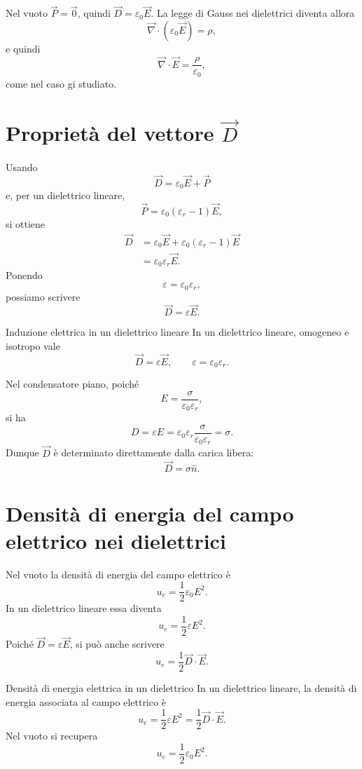 \documentclass[a4paper]{article}
\begin{document}
Nel vuoto \(\vec{P}=\vec{0}\), quindi \(\vec{D}=\varepsilon_0\vec{E}\). La legge di Gauss nei dielettrici diventa allora
\[
    \vec{\nabla}\cdot(\varepsilon_0\vec{E})=\rho,
\]
e quindi
\[
    \vec{\nabla}\cdot\vec{E}=\frac{\rho}{\varepsilon_0},
\]
come nel caso gi studiato.

\section{Proprietà del vettore \(\vec{D}\)}

Usando
\[
    \vec{D}=\varepsilon_0\vec{E}+\vec{P}
\]
e, per un dielettrico lineare,
\[
    \vec{P}=\varepsilon_0(\varepsilon_r-1)\vec{E},
\]
si ottiene
\begin{align*}
    \vec{D}
    &=\varepsilon_0\vec{E}+\varepsilon_0(\varepsilon_r-1)\vec{E} \\
    &=\varepsilon_0\varepsilon_r\vec{E}.
\end{align*}
Ponendo
\[
    \varepsilon=\varepsilon_0\varepsilon_r,
\]
possiamo scrivere
\[
    \vec{D}=\varepsilon\vec{E}.
\]

\begin{snippetproposition}{Induzione elettrica in un dielettrico lineare}
    In un dielettrico lineare, omogeneo e isotropo vale
    \[
        \vec{D}=\varepsilon\vec{E},
        \qquad
        \varepsilon=\varepsilon_0\varepsilon_r.
    \]
\end{snippetproposition}

Nel condensatore piano, poiché
\[
    E=\frac{\sigma}{\varepsilon_0\varepsilon_r},
\]
si ha
\[
    D=\varepsilon E=\varepsilon_0\varepsilon_r\frac{\sigma}{\varepsilon_0\varepsilon_r}=\sigma.
\]
Dunque \(\vec{D}\) è determinato direttamente dalla carica libera:
\[
    \vec{D}=\sigma\hat{n}.
\]

\section{Densità di energia del campo elettrico nei dielettrici}

Nel vuoto la densità di energia del campo elettrico è
\[
    u_e=\frac{1}{2}\varepsilon_0E^2.
\]
In un dielettrico lineare essa diventa
\[
    u_e=\frac{1}{2}\varepsilon E^2.
\]
Poiché \(\vec{D}=\varepsilon\vec{E}\), si può anche scrivere
\[
    u_e=\frac{1}{2}\vec{D}\cdot\vec{E}.
\]

\begin{snippetproposition}{Densità di energia elettrica in un dielettrico}
    In un dielettrico lineare, la densità di energia associata al campo elettrico è
    \[
        u_e=\frac{1}{2}\varepsilon E^2=\frac{1}{2}\vec{D}\cdot\vec{E}.
    \]
    Nel vuoto si recupera
    \[
        u_e=\frac{1}{2}\varepsilon_0E^2.
    \]
\end{snippetproposition}
\end{document}
